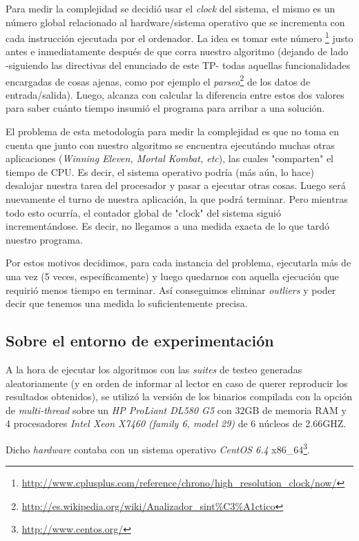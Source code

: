 \par Para medir la complejidad se decidi\'o usar el \emph{clock} del sistema,
    el mismo es un n\'umero global relacionado al hardware/sistema operativo
    que se incrementa con cada instrucci\'on ejecutada por el ordenador. La idea
    es tomar este n\'umero \footnote{%
    \url{http://www.cplusplus.com/reference/chrono/high_resolution_clock/now/}}
    justo antes e inmediatamente despu\'es de que corra nuestro algoritmo
    (dejando de lado -siguiendo las directivas del enunciado de este TP-
    todas aquellas funcionalidades encargadas de cosas ajenas, como
    por ejemplo el \emph{parseo}\footnote{%
    \url{http://es.wikipedia.org/wiki/Analizador_sint\%C3\%A1ctico}} de los datos
    de entrada/salida). Luego, alcanza con calcular la diferencia entre estos dos
    valores para saber cu\'anto tiempo insumi\'o el programa para arribar a una soluci\'on.

\par El problema de esta metodolog\'ia para medir la complejidad es que no
    toma en cuenta que junto con nuestro algoritmo se encuentra ejecut\'ando
    muchas otras aplicaciones (\emph{Winning Eleven, Mortal Kombat, etc}), las
    cuales "comparten" el tiempo de CPU. Es decir, el sistema operativo podr\'ia
    (m\'as a\'un, lo hace) desalojar nuestra tarea del procesador y pasar a
    ejecutar otras cosas. Luego ser\'a nuevamente el turno de nuestra
    aplicaci\'on, la que podr\'a terminar. Pero mientras todo esto ocurr\'ia,
    el contador global de "clock" del sistema sigui\'o increment\'andose. Es
    decir, no llegamos a una medida exacta de lo que tard\'o nuestro programa.

\par Por estos motivos decidimos, para cada instancia del problema, ejecutarla
    m\'as de una vez (5 veces, espec\'ificamente) y luego quedarnos con aquella
    ejecuci\'on que requiri\'o menos tiempo en terminar. As\'i
    conseguimos eliminar \emph{outliers} y poder decir que tenemos una medida
    lo suficientemente precisa.

{}
\subsection*{Sobre el entorno de experimentaci\'on}
\par A la hora de ejecutar los algoritmos con las \emph{suites} de testeo
    generadas aleatoriamente (y en orden de informar al lector en caso
    de querer reproducir los resultados obtenidos), se utiliz\'o la versi\'on
    de los binarios compilada con la opci\'on de \emph{multi-thread} sobre
    un \emph{HP ProLiant DL580 G5} con 32GB de memoria RAM y 4 procesadores
    \emph{Intel Xeon X7460 (family 6, model 29)} de 6 n\'ucleos de 2.66GHZ.

\par Dicho \emph{hardware} contaba con un sistema operativo \emph{CentOS 6.4}
    x86\_64\footnote{\url{http://www.centos.org/}}.
